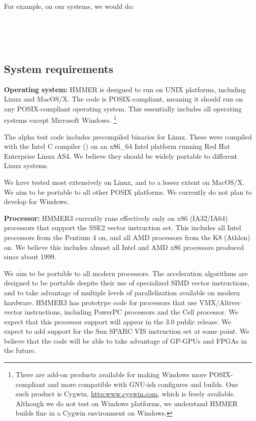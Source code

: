 For example, on our systems, we would do:

\\
\\
\\


\subsection{System requirements}

\textbf{Operating system:} HMMER is designed to run on UNIX platforms,
including Linux and MacOS/X. The code is POSIX-compliant, meaning it
should run on any POSIX-compliant operating system. This essentially
includes all operating systems except Microsoft Windows.
\footnote{There are add-on products available for making Windows more
  POSIX-compliant and more compatible with GNU-ish configures and
  builds. One such product is Cygwin, \url{http:www.cygwin.com}, which
  is freely available. Although we do not test on Windows platforms,
  we understand HMMER builds fine in a Cygwin environment on Windows.}

The alpha test code includes precompiled binaries for Linux. These
were compiled with the Intel C compiler () on an x86\_64
Intel platform running Red Hat Enterprise Linux AS4. We believe they
should be widely portable to different Linux systems. 

We have tested most extensively on Linux, and to a lesser extent on
MacOS/X. We aim to be portable to all other POSIX platforms. We
currently do not plan to develop for Windows.


\textbf{Processor:} HMMER3 currently runs effectively only on x86
(IA32/IA64) processors that support the SSE2 vector instruction set.
This includes all Intel processors from the Pentium 4 on, and all AMD
processors from the K8 (Athlon) on. We believe this includes almost
all Intel and AMD x86 processors produced since about 1999.

We aim to be portable to all modern processors. The acceleration
algorithms are designed to be portable despite their use of
specialized SIMD vector instructions, and to take advantage of
multiple levels of parallelization available on modern hardware.
HMMER3 has prototype code for processors that use VMX/Altivec vector
instructions, including PowerPC processors and the Cell processor. We
expect that this processor support will appear in the 3.0 public
release. We expect to add support for the Sun SPARC VIS instruction
set at some point. We believe that the code will be able to take
advantage of GP-GPUs and FPGAs in the future.

